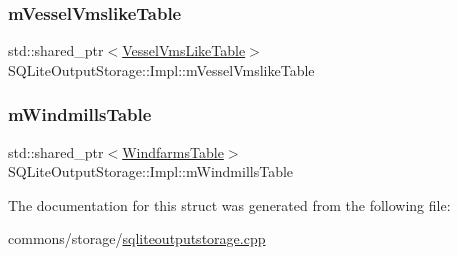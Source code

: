 \mbox{\label{struct_s_q_lite_output_storage_1_1_impl_a6e1423fa8febd4779ba3f02e8f1beba0}} 
\subsubsection{\texorpdfstring{mVesselVmslikeTable}{mVesselVmslikeTable}}
{\footnotesize\ttfamily std\+::shared\+\_\+ptr$<$\mbox{\hyperlink{class_vessel_vms_like_table}{Vessel\+Vms\+Like\+Table}}$>$ S\+Q\+Lite\+Output\+Storage\+::\+Impl\+::m\+Vessel\+Vmslike\+Table}

\mbox{\label{struct_s_q_lite_output_storage_1_1_impl_a6dc456befff721970ef68651aca1cd20}} 
\subsubsection{\texorpdfstring{mWindmillsTable}{mWindmillsTable}}
{\footnotesize\ttfamily std\+::shared\+\_\+ptr$<$\mbox{\hyperlink{class_windfarms_table}{Windfarms\+Table}}$>$ S\+Q\+Lite\+Output\+Storage\+::\+Impl\+::m\+Windmills\+Table}



The documentation for this struct was generated from the following file\+:\begin{DoxyCompactItemize}
\item 
commons/storage/\mbox{\hyperlink{sqliteoutputstorage_8cpp}{sqliteoutputstorage.\+cpp}}\end{DoxyCompactItemize}
